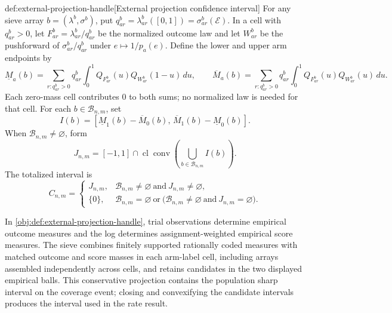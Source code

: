 \begin{definitionv}{def:external-projection-handle}[External projection confidence interval]
For any sieve array \(b=(\lambda^b,\sigma^b)\), put \(q^b_{ar}=\lambda^b_{ar}([0,1])=\sigma^b_{ar}(\mathcal E)\). In a cell with \(q^b_{ar}>0\), let \(F^b_{ar}=\lambda^b_{ar}/q^b_{ar}\) be the normalized outcome law and let \(W^b_{ar}\) be the pushforward of \(\sigma^b_{ar}/q^b_{ar}\) under \(e\mapsto 1/p_a(e)\). Define the lower and upper arm endpoints by
\[
\underline M_a(b)=\sum_{r:q^b_{ar}>0}q^b_{ar}\int_0^1 Q_{F^b_{ar}}(u)Q_{W^b_{ar}}(1-u)\,du,
\qquad
\overline M_a(b)=\sum_{r:q^b_{ar}>0}q^b_{ar}\int_0^1 Q_{F^b_{ar}}(u)Q_{W^b_{ar}}(u)\,du.
\]
Each zero-mass cell contributes \(0\) to both sums; no normalized law is needed for that cell. For each \(b\in\mathcal B_{n,m}\), set
\[
I(b)=[\underline M_1(b)-\overline M_0(b),\,\overline M_1(b)-\underline M_0(b)].
\]
When \(\mathcal B_{n,m}\ne\varnothing\), form
\[
J_{n,m}
=
[-1,1]\cap
\operatorname{cl}\operatorname{conv}
\left(\bigcup_{b\in\mathcal B_{n,m}}I(b)\right).
\]
The totalized interval is
\[
C_{n,m}
=
\begin{cases}
J_{n,m},&
\mathcal B_{n,m}\ne\varnothing\ \text{and}\ J_{n,m}\ne\varnothing,\\
\{0\},&
\mathcal B_{n,m}=\varnothing\ \text{or}\
\bigl(\mathcal B_{n,m}\ne\varnothing\ \text{and}\ J_{n,m}=\varnothing\bigr).
\end{cases}
\]
\end{definitionv}

In \cref{obj:def:external-projection-handle}, trial observations determine empirical outcome measures and the log determines assignment-weighted empirical score measures. The sieve combines finitely supported rationally coded measures with matched outcome and score masses in each arm-label cell, including arrays assembled independently across cells, and retains candidates in the two displayed empirical balls. This conservative projection contains the population sharp interval on the coverage event; closing and convexifying the candidate intervals produces the interval  used in the rate result.

